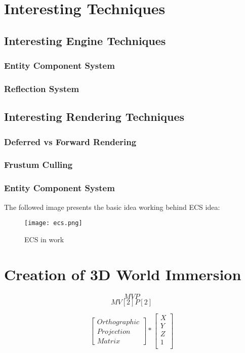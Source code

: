 \newpage
\section{Interesting Techniques} %
\subsection{Interesting Engine Techniques}
\subsubsection{Entity Component System}
\label{sec:theory_ecs}
\subsubsection{Reflection System}
\label{sec:refl}

\newpage
\subsection{Interesting Rendering Techniques}
\subsubsection{Deferred vs Forward Rendering}
\label{sec:defer_vs_forward}

\subsubsection{Frustum Culling}
\subsubsection{Entity Component System}
The followed image presents the basic idea working behind ECS idea:
\begin{figure}[H]
  \texttt{[image: ecs.png]}
  \caption{ECS in work}
\end{figure}

\newpage
\section{Creation of 3D World Immersion}
\[MVP\]
\[MV[2]P[2]\]

\[
\begin{bmatrix}
Orthographic\\
Projection \\
Matrix
\end{bmatrix} 
*
\begin{bmatrix}
X\\
Y\\
Z\\
1\\
\end{bmatrix} 
\]

